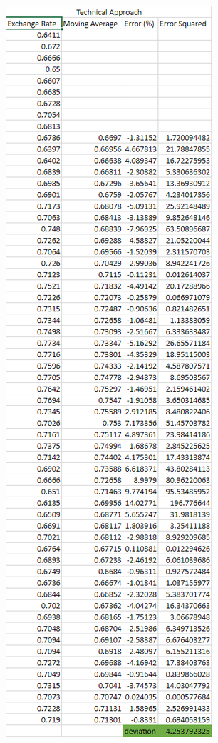 \documentclass{article}
\begin{document}
\begin{figure}[h!]
    \centering
    \includegraphics[scale=0.5]{graphs/appendix3-Technical.png}
\end{figure}
\end{document}
